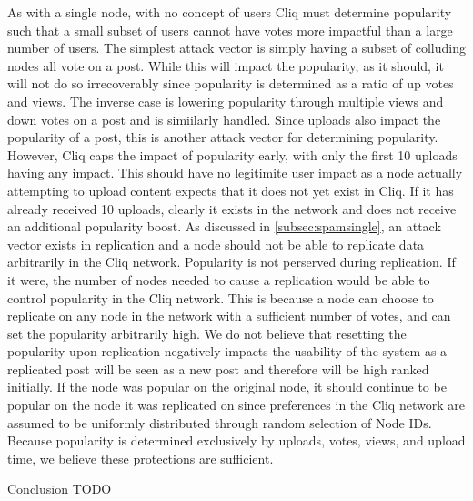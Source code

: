 \documentclass{sig-alternate}
\begin{document}
As with a single node, with no concept of users Cliq must determine popularity such that a small subset of users cannot have votes more impactful than a large number of users. 
The simplest attack vector is simply having a subset of colluding nodes all vote on a post. 
While this will impact the popularity, as it should, it will not do so irrecoverably since popularity is determined as a ratio of up votes and views. 
The inverse case is lowering popularity through multiple views and down votes on a post and is simiilarly handled. 
Since uploads also impact the popularity of a post, this is another attack vector for determining popularity. 
However, Cliq caps the impact of popularity early, with only the first 10 uploads having any impact. 
This should have no legitimite user impact as a node actually attempting to upload content expects that it does not yet exist in Cliq. 
If it has already received 10 uploads, clearly it exists in the network and does not receive an additional popularity boost. 
As discussed in \ref{subsec:spamsingle}, an attack vector exists in replication and a node should not be able to replicate data arbitrarily in the Cliq network. 
Popularity is not perserved during replication. 
If it were, the number of nodes needed to cause a replication would be able to control popularity in the Cliq network. 
This is because a node can choose to replicate on any node in the network with a sufficient number of votes, and can set the popularity arbitrarily high. 
We do not believe that resetting the popularity upon replication negatively impacts the usability of the system as a replicated post will be seen as a new post and therefore will be high ranked initially. 
If the node was popular on the original node, it should continue to be popular on the node it was replicated on since preferences in the Cliq network are assumed to be uniformly distributed through random selection of Node IDs. 
Because popularity is determined exclusively by uploads, votes, views, and upload time, we believe these protections are sufficient. 

\begin{section}{Conclusion}
  TODO
\end{section}



\end{document}

